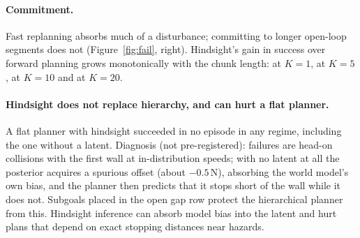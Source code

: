 \documentclass[11pt]{article}
\begin{document}
\paragraph{Commitment.} Fast replanning absorbs much of a disturbance; committing to longer open-loop segments does not
(Figure~\ref{fig:fail}, right). Hindsight's gain in success over forward planning grows monotonically with the chunk
length: \hkGainOne{} at $K=1$, \hkGainFive{} at $K=5$, \hkGainTen{} at $K=10$ and \hkGainTwenty{} at $K=20$.

\paragraph{Hindsight does not replace hierarchy, and can hurt a flat planner.} A flat planner with hindsight
succeeded in no episode in any regime, including the one without a latent. Diagnosis (not pre-registered): failures
are head-on collisions with the first wall at in-distribution speeds; with no latent at all the posterior acquires a
spurious offset (about $-0.5$\,N), absorbing the world model's own bias, and the planner then predicts that it stops
short of the wall while it does not. Subgoals placed in the open gap row protect the hierarchical planner from this.
Hindsight inference can absorb model bias into the latent and hurt plans that depend on exact stopping distances near
hazards.
\end{document}
